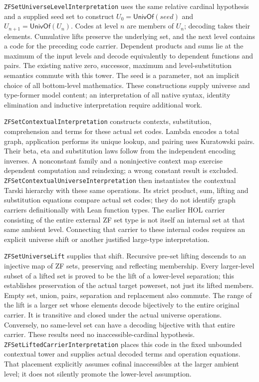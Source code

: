 \documentclass[11pt]{article}
\theoremstyle{definition}
\theoremstyle{remark}
\begin{document}
\nolinkurl{ZFSetUniverseLevelInterpretation} uses the same relative
cardinal hypothesis and a supplied seed set to construct
\(U_0=\mathsf{UnivOf}(\mathit{seed})\) and
\(U_{n+1}=\mathsf{UnivOf}(U_n)\). Codes at level \(n\) are members of
\(U_n\); decoding takes their elements. Cumulative lifts preserve the
underlying set, and the next level contains a code for the preceding code
carrier. Dependent products and sums lie at the maximum of the input
levels and decode equivalently to dependent functions and pairs. The
existing native zero, successor, maximum and level-substitution semantics
commute with this tower. The seed is a parameter, not an implicit choice
of all bottom-level mathematics. These constructions supply universe and
type-former model content; an interpretation of all native syntax, identity
elimination and inductive interpretation require additional work.

\nolinkurl{ZFSetContextualInterpretation} constructs contexts, substitution,
comprehension and terms for these actual set codes. Lambda encodes a total
graph, application performs its unique lookup, and pairing uses Kuratowski
pairs. Their beta, eta and substitution laws follow from the independent
encoding inverses. A nonconstant family and a noninjective context map
exercise dependent computation and reindexing; a wrong constant result is
excluded. \nolinkurl{ZFSetContextualUniverseInterpretation} then instantiates
the contextual Tarski hierarchy with these same operations. Its strict
product, sum, lifting and substitution equations compare actual set codes;
they do not identify graph carriers definitionally with Lean function types.
The earlier HOL carrier consisting of the entire external ZF set type is
not itself an internal set at that same ambient level. Connecting that
carrier to these internal codes requires an explicit universe shift or
another justified large-type interpretation.

\nolinkurl{ZFSetUniverseLift} supplies that shift. Recursive pre-set lifting
descends to an injective map of ZF sets, preserving and reflecting membership.
Every larger-level subset of a lifted set is proved to be the lift of a
lower-level separation; this establishes preservation of the actual target
powerset, not just its lifted members. Empty set, union, pairs, separation
and replacement also commute. The range of the lift is a larger set whose
elements decode bijectively to the entire original carrier. It is transitive
and closed under the actual universe operations. Conversely, no same-level
set can have a decoding bijective with that entire carrier. These results
need no inaccessible-cardinal hypothesis.
\nolinkurl{ZFSetLiftedCarrierInterpretation} places this code in the fixed
unbounded contextual tower and supplies actual decoded terms and operation
equations. That placement explicitly assumes cofinal inaccessibles at the
larger ambient level; it does not silently promote the lower-level assumption.
\end{document}
